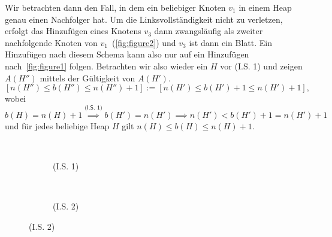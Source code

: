 \documentclass[10pt]{article}
\begin{document}
\begin{loesung}
\begin{enumerate}
\begin{beweis}
                \IS[2] Wir betrachten dann den Fall, in dem ein beliebiger Knoten $v_1$ in einem Heap genau einen Nachfolger hat.
                Um die Linksvollständigkeit nicht zu verletzen, erfolgt das Hinzufügen eines Knotens $v_3$ dann zwangsläufig als zweiter nachfolgende Knoten von $v_1$~(\autoref{fig:figure2}) und $v_3$ ist dann ein Blatt.
                Ein Hinzufügen nach diesem Schema kann also nur auf ein Hinzufügen nach~\autoref{fig:figure1} folgen.
                Betrachten wir also wieder ein $H$ vor \textsf{(I.S. 1)} und zeigen $A(H'')$ mittels der Gültigkeit von $A(H')$.
                \[
                    [n(H'') \leq b(H'') \leq n(H'') + 1] := [n(H') \leq b(H') + 1 \leq n(H') + 1],
                \]
                wobei $b(H) = n(H) + 1 \stackrel{\textsf{(I.S. 1)}}{\implies} b(H') = n(H') \implies n(H') < b(H') + 1 = n(H') + 1$ und für jedes beliebige Heap $H$ gilt $n(H) \leq b(H) \leq n(H) + 1$.
            \end{beweis}
            \begin{figure}[h]
                \caption{Induktionsschritte}
                \centering
                \begin{subfigure}{.3\textwidth}
                    \caption{{\sf(I.S. 1)}}
                    \\[1pt]
                    \centering
                     \Rightarrow
                    \label{fig:figure1}
                \end{subfigure}
                \begin{subfigure}{.3\textwidth}
                    \caption{{\sf(I.S. 2)}}
                    \\[1pt]

\end{subfigure}
\end{figure}
\end{enumerate}
\end{loesung}
\end{document}
